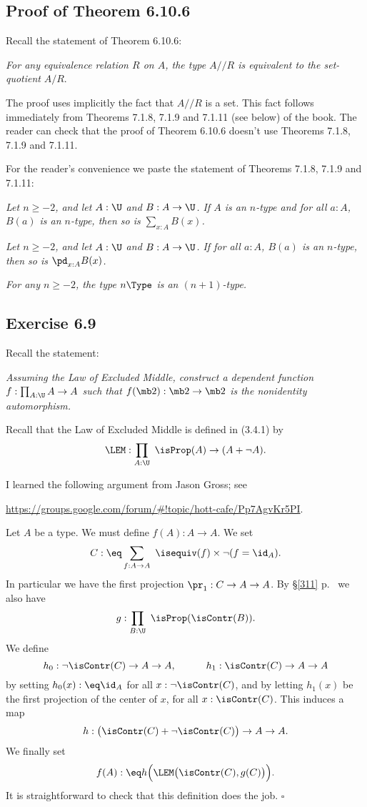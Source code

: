 \documentclass[12pt]{article}
\begin{document}
\subsection{Proof of Theorem 6.10.6}%

Recall the statement of Theorem 6.10.6: 

\emph{For any equivalence relation $R$ on $A$, the type $A/\!\!/R$ is equivalent to the set-quotient} $A/R$.

The proof uses implicitly the fact that $A/\!\!/R$ is a set. This fact follows immediately from Theorems 7.1.8, 7.1.9 and 7.1.11 (see below) of the book. The reader can check that the proof of Theorem 6.10.6 doesn't use Theorems 7.1.8, 7.1.9 and 7.1.11.

For the reader's convenience we paste the statement of Theorems 7.1.8, 7.1.9 and 7.1.11:

\nn{} \emph{Let $n\geq-2$, and let $A:\U$ and $B:A\to\U$. If $A$ is an $n$-type and for all $a:A$, $B(a)$ is an $n$-type, then so is $\sum_{x:A}B(x)$.}

\nn{} \emph{Let $n\geq-2$, and let $A:\U$ and $B:A\to\U$. If for all $a:A$, $B(a)$ is an $n$-type, then so is $\pd_{x : A}B(x)$.}

\nn{} \emph{For any $n\geq-2$, the type $n\Type$ is an $(n+1)$-type.}


\subsection{Exercise 6.9}


Recall the statement:

\emph{Assuming the Law of Excluded Middle, construct a dependent function $f:\prod_{A:\U}A\to A$ such that $f(\mb2):\mb2\to\mb2$ is the nonidentity automorphism.}

Recall that the Law of Excluded Middle is defined in (3.4.1) by 
$$
\LEM:\prod_{A:\U}\ \isProp(A)\to(A+\neg A).
$$ 

I learned the following argument from Jason Gross; see 

\nn\href{https://groups.google.com/forum/#!topic/hott-cafe/Pp7AgvKr5PI}{https://groups.google.com/forum/\#!topic/hott-cafe/Pp7AgvKr5PI}.

Let $A$ be a type. We must define $f(A):A\to A$. We set 
$$
C:\eq\sum_{f:A\to A}\ \isequiv(f)\times\neg(f=\id_A).
$$ 
In particular we have the first projection $\pr_1:C\to A\to A$. By \S\ref{311} p.~\pageref{311} we also have 
$$
g:\prod_{B:\U}\ \isProp(\isContr(B)).
$$ 
We define 
$$
h_0:\neg\isContr(C)\to A\to A,\qquad\quad h_1:\isContr(C)\to A\to A
$$ 
by setting $h_0(x):\eq\id_A$ for all $x:\neg\isContr(C)$, and by letting $h_1(x)$ be the first projection of the center of $x$, for all $x:\isContr(C)$. This induces a map 
$$
h:\big(\isContr(C)+\neg\isContr(C)\big)\to A\to A.
$$ 
We finally set 
$$
f(A):\eq h\Big(\LEM\big(\isContr(C),g(C)\big)\Big).
$$
It is straightforward to check that this definition does the job. $\square$
\end{document}
